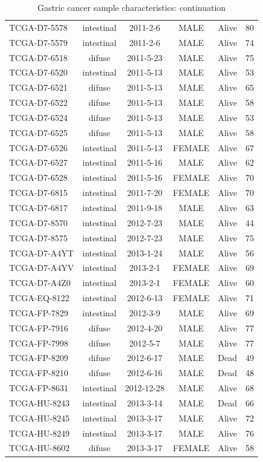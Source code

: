 \documentclass[11pt]{amsart}
\theoremstyle{definition}
\begin{document}
\begin{table}
\begin{center}
\begin{tabular}{lccccc}
TCGA-D7-5578 & intestinal & 2011-2-6 & MALE & Alive & 80 \\
TCGA-D7-5579 & intestinal & 2011-2-6 & MALE & Alive & 74 \\
TCGA-D7-6518 & difuse & 2011-5-23 & MALE & Alive & 75 \\
TCGA-D7-6520 & intestinal & 2011-5-13 & MALE & Alive & 53 \\
TCGA-D7-6521 & difuse & 2011-5-13 & MALE & Alive & 65 \\
TCGA-D7-6522 & difuse & 2011-5-13 & MALE & Alive & 58 \\
TCGA-D7-6524 & difuse & 2011-5-13 & MALE & Alive & 53 \\
TCGA-D7-6525 & difuse & 2011-5-13 & MALE & Alive & 58 \\
TCGA-D7-6526 & intestinal & 2011-5-13 & FEMALE & Alive & 67 \\
TCGA-D7-6527 & intestinal & 2011-5-16 & MALE & Alive & 62 \\
TCGA-D7-6528 & intestinal & 2011-5-16 & FEMALE & Alive & 70 \\
TCGA-D7-6815 & intestinal & 2011-7-20 & FEMALE & Alive & 70 \\
TCGA-D7-6817 & intestinal & 2011-9-18 & MALE & Alive & 63 \\
TCGA-D7-8570 & intestinal & 2012-7-23 & MALE & Alive & 44 \\
TCGA-D7-8575 & intestinal & 2012-7-23 & MALE & Alive & 75 \\
TCGA-D7-A4YT & intestinal & 2013-1-24 & MALE & Alive & 56 \\
TCGA-D7-A4YV & intestinal & 2013-2-1 & FEMALE & Alive & 69 \\
TCGA-D7-A4Z0 & intestinal & 2013-2-1 & FEMALE & Alive & 60 \\
TCGA-EQ-8122 & intestinal & 2012-6-13 & FEMALE & Alive & 71 \\
TCGA-FP-7829 & intestinal & 2012-3-9 & MALE & Alive & 69 \\
TCGA-FP-7916 & difuse & 2012-4-20 & MALE & Alive & 77 \\
TCGA-FP-7998 & difuse & 2012-5-7 & MALE & Alive & 77 \\
TCGA-FP-8209 & difuse & 2012-6-17 & MALE & Dead & 49 \\
TCGA-FP-8210 & difuse & 2012-6-16 & MALE & Dead & 48 \\
TCGA-FP-8631 & intestinal & 2012-12-28 & MALE & Alive & 68 \\
TCGA-HU-8243 & intestinal & 2013-3-14 & MALE & Dead & 66 \\
TCGA-HU-8245 & intestinal & 2013-3-17 & MALE & Alive & 72 \\
TCGA-HU-8249 & intestinal & 2013-3-17 & MALE & Alive & 76 \\
TCGA-HU-8602 & difuse & 2013-3-17 & FEMALE & Alive & 58 \\[1em]
\end{tabular}
\caption{Gastric cancer sample characteristics: continuation}
\label{tbl:gastric_PartB}
\end{center}
\end{table}
\end{document}
